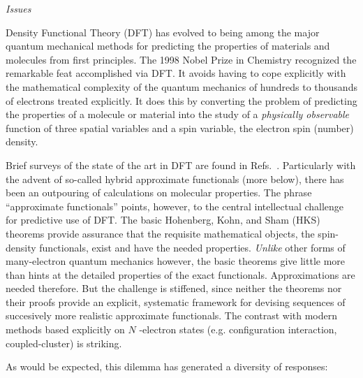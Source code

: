 \documentclass[nofootinbib,floatfix,aps,pra,preprint]{revtex4}
\begin{document}
\textrm{\setcounter{page}{1} \noindent \emph{Issues} }

\textrm{Density Functional Theory (DFT) has evolved to being among the major
quantum mechanical methods for predicting the properties of materials and
molecules from first principles. The 1998 Nobel Prize in Chemistry
recognized the remarkable feat accomplished via DFT. It avoids having to
cope explicitly with the mathematical complexity of the quantum mechanics of
hundreds to thousands of electrons treated explicitly. It does this by
converting the problem of predicting the properties of a molecule or
material into the study of a \emph{physically observable} function of three
spatial variables and a spin variable, the electron spin (number) density. }

\textrm{Brief surveys of the state of the art in DFT are found in Refs.~\cite%
{DFTrefs}. Particularly with the advent of so-called hybrid approximate
functionals (more below), there has been an outpouring of calculations on
molecular properties. The phrase ``approximate functionals'' points,
however, to the central intellectual challenge for predictive use of DFT.
The basic Hohenberg, Kohn, and Sham (HKS) theorems \cite{HKS} provide
assurance that the requisite mathematical objects, the spin-density
functionals, exist and have the needed properties. \emph{Unlike} other forms
of many-electron quantum mechanics however, the basic theorems give little
more than hints at the detailed properties of the exact functionals.
Approximations are needed therefore. But the challenge is stiffened, since
neither the theorems nor their proofs provide an explicit, systematic
framework for devising sequences of succesively more realistic approximate
functionals. The contrast with modern methods based explicitly on $N$%
-electron states (e.g. configuration interaction, coupled-cluster) is
striking. }

\textrm{As would be expected, this dilemma has generated a diversity of
responses: \vspace{-0.2cm} }
\end{document}
